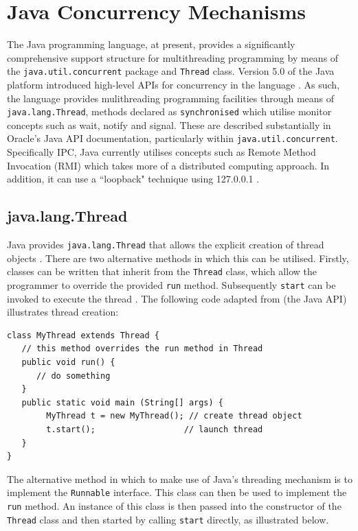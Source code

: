 \documentclass[12pt,a4paper,oneside]{article}
\def\code#1{\texttt{#1}}
\begin{document}
\section{Java Concurrency Mechanisms} %
\begin{spacing}{1.4}
The Java programming language, at present, provides a significantly comprehensive support structure for multithreading programming by means of the \code{java.util.concurrent} package and \code{Thread} class. Version 5.0 of the Java platform introduced high-level APIs for concurrency in the language \citep{JavaAPI}. As such, the language provides mulithreading programming facilities through means of \code{java.lang.Thread}, methods declared as \code{synchronised} which utilise monitor concepts such as wait, notify and signal. These are described substantially in Oracle's Java API documentation, particularly within \code{java.util.concurrent}. Specifically IPC, Java currently utilises concepts such as Remote Method Invocation (RMI) which takes more of a
distributed computing approach. In addition, it can use a ``loopback" technique using 127.0.0.1 \citep{WellsIPCJava}.

\subsection{java.lang.Thread}
Java provides \code{java.lang.Thread} that allows the explicit creation of thread objects \citep{garg2005concurrent}. There are two alternative methods in which this can be utilised. Firstly, classes can be written that inherit from the \code{Thread} class, which allow the programmer to override the provided \code{run} method. Subsequently \code{start{}} can be invoked to execute the thread \citep{garg2005concurrent}. The following code adapted from \cite{JavaAPI} (the Java API) illustrates thread creation:
\end{spacing}
\begin{verbatim}
class MyThread extends Thread {
   // this method overrides the run method in Thread  
   public void run() {
      // do something
   }
   public static void main (String[] args) {
        MyThread t = new MyThread(); // create thread object
        t.start();					// launch thread
   }
}
\end{verbatim}
\begin{spacing}{1.4}
The alternative method in which to make use of Java's threading mechanism is to implement the \code{Runnable} interface. This class can then be used to implement the \code{run} method. An instance of this class is then passed into the constructor of the \code{Thread} class and then started by calling \code{start} directly, as illustrated below.
\end{spacing}
\end{document}
